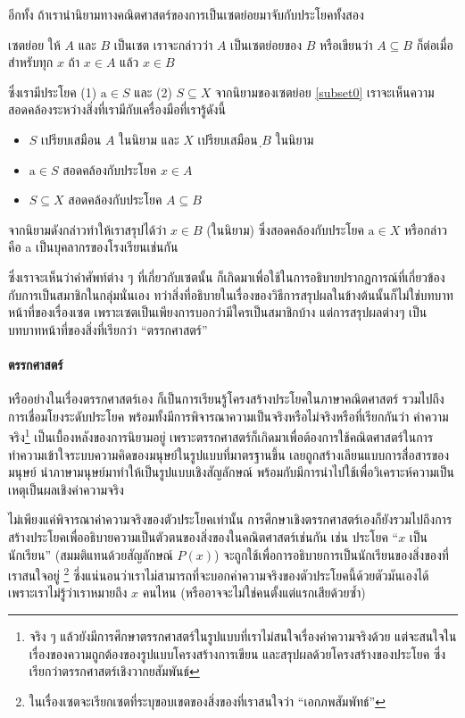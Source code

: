 อีกทั้ง ถ้าเรานำนิยามทางคณิตศาสตร์ของการเป็นเซตย่อยมาจับกับประโยคทั้งสอง
\begin{defn}[label=subset0]{เซตย่อย}{} 
	ให้ $A$ และ $B$ เป็นเซต เราจะกล่าวว่า $A$ เป็นเซตย่อยของ $B$ หรือเขียนว่า $A \subseteq B$ ก็ต่อเมื่อ สำหรับทุก $x$ ถ้า $x\in A$ แล้ว $x\in B$
\end{defn}
\noindent ซึ่งเรามีประโยค (1) $\text{a} \in S$ และ (2) $S \subseteq X$ จากนิยามของเซตย่อย \ref{subset0} เราจะเห็นความสอดคล้องระหว่างสิ่งที่เรามีกับเครื่องมือที่เรารู้ดังนี้
\begin{itemize}
	\item $S$ เปรียบเสมือน $A$ ในนิยาม และ $X$ เปรียบเสมือน $ฺB$ ในนิยาม
	\item $\text{a} \in S$ สอดคล้องกับประโยค $x\in A$
	\item $S \subseteq X$ สอดคล้องกับประโยค $A \subseteq B$
\end{itemize}
จากนิยามดังกล่าวทำให้เราสรุปได้ว่า $x\in B$ (ในนิยาม) ซึ่งสอดคล้องกับประโยค $\text{a} \in X $
หรือกล่าวคือ a เป็นบุคลากรของโรงเรียนเช่นกัน

ซึ่งเราจะเห็นว่าคำศัพท์ต่าง ๆ ที่เกี่ยวกับเซตนั้น ก็เกิดมาเพื่อใช้ในการอธิบายปรากฏการณ์ที่เกี่ยวข้องกับการเป็นสมาชิกในกลุ่มนั่นเอง
ทว่าสิ่งที่อธิบายในเรื่องของวิธีการสรุปผลในข้างต้นนั้นก็ไม่ใช่บทบาทหน้าที่ของเรื่องเซต เพราะเซตเป็นเพียงการบอกว่ามีใครเป็นสมาชิกบ้าง แต่การสรุปผลต่างๆ เป็นบทบาทหน้าที่ของสิ่งที่เรียกว่า ``ตรรกศาสตร์''

\paragraph{ตรรกศาสตร์} หรืออย่างในเรื่องตรรกศาสตร์เอง ก็เป็นการเรียนรู้โครงสร้างประโยคในภาษาคณิตศาสตร์ รวมไปถึงการเชื่อมโยงระดับประโยค พร้อมทั้งมีการพิจารณาความเป็นจริงหรือไม่จริงหรือที่เรียกกันว่า ค่าความจริง\footnote{จริง ๆ แล้วยังมีการศึกษาตรรกศาสตร์ในรูปแบบที่เราไม่สนใจเรื่องค่าความจริงด้วย แต่จะสนใจในเรื่องของความถูกต้องของรูปแบบโครงสร้างการเขียน และสรุปผลด้วยโครงสร้างของประโยค ซึ่งเรียกว่าตรรกศาสตร์เชิงวากยสัมพันธ์} เป็นเบื้องหลังของการนิยามอยู่ เพราะตรรกศาสตร์ก็เกิดมาเพื่อต้องการใช้คณิตศาสตร์ในการทำความเข้าใจระบบความคิดของมนุษย์ในรูปแบบที่มาตรฐานขึ้น เลยถูกสร้างเลียนแบบการสื่อสารของมนุษย์ นำภาษามนุษย์มาทำให้เป็นรูปแบบเชิงสัญลักษณ์ พร้อมกับมีการนำไปใช้เพื่อวิเคราะห์ความเป็นเหตุเป็นผลเชิงค่าความจริง

ไม่เพียงแค่พิจารณาค่าความจริงของตัวประโยคเท่านั้น การศึกษาเชิงตรรกศาสตร์เองก็ยังรวมไปถึงการสร้างประโยคเพื่ออธิบายความเป็นตัวตนของสิ่งของในคณิตศาสตร์เช่นกัน เช่น ประโยค ``$x$ เป็นนักเรียน'' (สมมติแทนด้วยสัญลักษณ์ $P(x)$) จะถูกใช้เพื่อการอธิบายการเป็นนักเรียนของสิ่งของที่เราสนใจอยู่ \footnote{ในเรื่องเซตจะเรียกเซตที่ระบุขอบเขตของสิ่งของที่เราสนใจว่า ``เอกภพสัมพัทธ์''} ซึ่งแน่นอนว่าเราไม่สามารถที่จะบอกค่าความจริงของตัวประโยคนี้ด้วยตัวมันเองได้ เพราะเราไม่รู้ว่าเราหมายถึง $x$ คนไหน (หรืออาจจะไม่ใช่คนตั้งแต่แรกเสียด้วยซ้ำ) 

